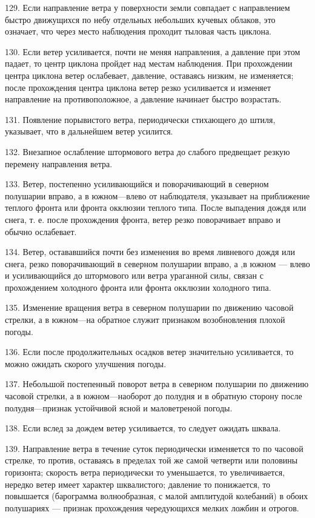 129. Если направление ветра у поверхности земли совпадает с направлением быстро движущихся по небу отдельных небольших кучевых облаков, это означает, что через место наблюдения проходит тыловая часть циклона.

130. Если ветер усиливается, почти не меняя направления, а давление при этом падает, то центр циклона пройдет над местам наблюдения. При прохождении центра циклона ветер ослабевает, давление, оставаясь низким, не изменяется; после прохождения центра циклона ветер резко усиливается и изменяет направление на противоположное, а давление начинает быстро возрастать.

131. Появление порывистого ветра, периодически стихающего до штиля, указывает, что в дальнейшем ветер усилится.

132. Внезапное ослабление штормового ветра до слабого предвещает резкую перемену направления ветра.

133. Ветер, постепенно усиливающийся и поворачивающий в северном полушарии вправо, а в южном—влево от наблюдателя, указывает на приближение теплого фронта или фронта окклюзии теплого типа. После выпадения дождя или снега, т. е. после прохождения фронта, ветер резко поворачивает вправо и обычно ослабевает.

134. Ветер, остававшийся почти без изменения во время ливневого дождя или снега, резко поворачивающий в северном полушарии вправо, а ,в южном — влево и усиливающийся до штормового или ветра ураганной силы, связан с прохождением холодного фронта или фронта окклюзии холодного типа.

135. Изменение вращения ветра в северном полушарии по движению часовой стрелки, а в южном—на обратное служит признаком возобновления плохой погоды.

136. Если после продолжительных осадков ветер значительно усиливается, то можно ожидать скорого улучшения погоды.

137. Небольшой постепенный поворот ветра в северном полушарии по движению часовой стрелки, а в южном—наоборот до полудня и в обратную сторону после полудня—признак устойчивой ясной и маловетреной погоды.

138. Если вслед за дождем ветер усиливается, то следует ожидать шквала.

139. Направление ветра в течение суток периодически изменяется то по часовой стрелке, то против, оставаясь в пределах той же самой четверти или половины горизонта; скорость ветра периодически то уменьшается, то увеличивается, нередко ветер имеет характер шквалистого; давление то понижается, то повышается (барограмма волнообразная, с малой амплитудой колебаний) в обоих полушариях — признак прохождения чередующихся мелких ложбин и отрогов.

